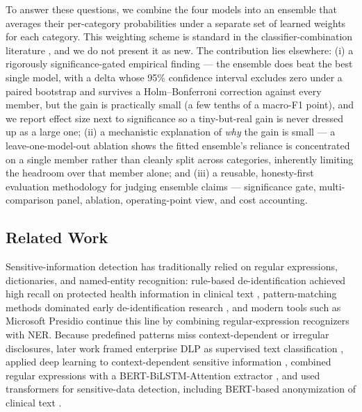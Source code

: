 \documentclass{article}
\begin{document}
To answer these questions, we combine the four models into an ensemble
that averages their per-category probabilities under a separate set of
learned weights for each category. This weighting scheme is standard in
the classifier-combination literature
\citep{kittler1998combining, kuncheva2004combining}, and we do not
present it as new. The contribution lies elsewhere: (i) a rigorously
significance-gated empirical finding --- the ensemble does beat the
best single model, with a delta whose 95\% confidence interval excludes
zero under a paired bootstrap and survives a Holm--Bonferroni
correction against every member, but the gain is practically small (a
few tenths of a macro-F1 point), and we report effect size next to
significance so a tiny-but-real gain is never dressed up as a large
one; (ii) a mechanistic explanation of \emph{why} the gain is small ---
a leave-one-model-out ablation shows the fitted ensemble's reliance is
concentrated on a single member rather than cleanly split across
categories, inherently limiting the headroom over that member alone;
and (iii) a reusable, honesty-first evaluation methodology for judging
ensemble claims --- significance gate, multi-comparison panel,
ablation, operating-point view, and cost accounting.

\subsection{Related Work}

Sensitive-information detection has traditionally relied on regular
expressions, dictionaries, and named-entity recognition: rule-based
de-identification achieved high recall on protected health information
in clinical text \citep{neamatullah2008deid}, pattern-matching methods
dominated early de-identification research \citep{meystre2010deid}, and
modern tools such as Microsoft Presidio \citep{presidio} continue this
line by combining regular-expression recognizers with NER. Because
predefined patterns miss context-dependent or irregular disclosures,
later work framed enterprise DLP as supervised text classification
\citep{hart2011dlp}, applied deep learning to context-dependent
sensitive information \citep{ahmed2021sensitive}, combined regular
expressions with a BERT-BiLSTM-Attention extractor
\citep{guo2021exsense}, and used transformers
\citep{devlin2019bert, liu2019roberta} for sensitive-data detection,
including BERT-based anonymization of clinical text
\citep{garciapablos2020bert}.
\end{document}

